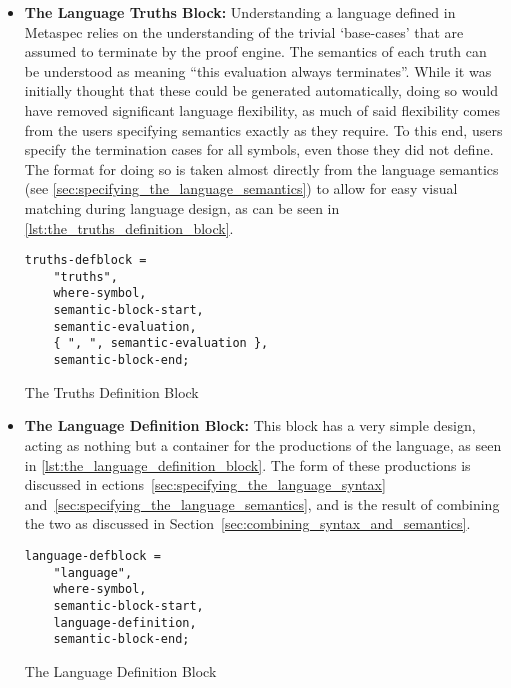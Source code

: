 \begin{itemize}
    \item \textbf{The Language Truths Block:} Understanding a language defined in Metaspec relies on the understanding of the trivial `base-cases' that are assumed to terminate by the proof engine. 
    The semantics of each truth can be understood as meaning ``this evaluation always terminates''.
    While it was initially thought that these could be generated automatically, doing so would have removed significant language flexibility, as much of said flexibility comes from the users specifying semantics exactly as they require. 
    To this end, users specify the termination cases for all symbols, even those they did not define.
    The format for doing so is taken almost directly from the language semantics (see \autoref{sec:specifying_the_language_semantics}) to allow for easy visual matching during language design, as can be seen in \autoref{lst:the_truths_definition_block}.
\begin{listing}[!htb]
\begin{verbatim}
truths-defblock =
    "truths",
    where-symbol, 
    semantic-block-start,
    semantic-evaluation,
    { ", ", semantic-evaluation },
    semantic-block-end;
\end{verbatim}
\caption{The Truths Definition Block}
\label{lst:the_truths_definition_block}
\end{listing}

    \item \textbf{The Language Definition Block:} This block has a very simple design, acting as nothing but a container for the productions of the language, as seen in \autoref{lst:the_language_definition_block}.
    The form of these productions is discussed in ections~\ref{sec:specifying_the_language_syntax} and~\ref{sec:specifying_the_language_semantics}, and is the result of combining the two as discussed in Section~\ref{sec:combining_syntax_and_semantics}.
\begin{listing}[!htb]
\begin{verbatim}
language-defblock =
    "language",
    where-symbol,
    semantic-block-start,
    language-definition,
    semantic-block-end;
\end{verbatim}
\caption{The Language Definition Block}
\label{lst:the_language_definition_block}
\end{listing}


\end{itemize}
